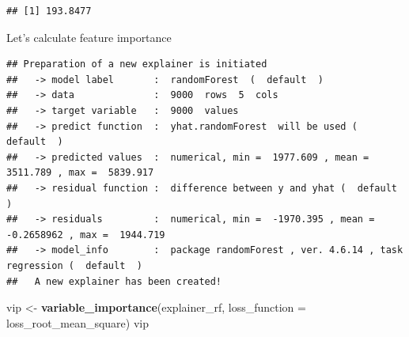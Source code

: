 \documentclass[12pt,]{krantz}
\newenvironment{Shaded}{\begin{snugshade}}{\end{snugshade}}
\newcommand{\DataTypeTok}[1]{\textcolor[rgb]{0.13,0.29,0.53}{#1}}
\newcommand{\DecValTok}[1]{\textcolor[rgb]{0.00,0.00,0.81}{#1}}
\newcommand{\KeywordTok}[1]{\textcolor[rgb]{0.13,0.29,0.53}{\textbf{#1}}}
\newcommand{\NormalTok}[1]{#1}
\newcommand{\OperatorTok}[1]{\textcolor[rgb]{0.81,0.36,0.00}{\textbf{#1}}}
\newcommand{\OtherTok}[1]{\textcolor[rgb]{0.56,0.35,0.01}{#1}}
\newcommand{\StringTok}[1]{\textcolor[rgb]{0.31,0.60,0.02}{#1}}
\begin{document}
\begin{Shaded}
\end{Shaded}

\begin{verbatim}
## [1] 193.8477
\end{verbatim}

Let's calculate feature importance

\begin{Shaded}
\end{Shaded}

\begin{verbatim}
## Preparation of a new explainer is initiated
##   -> model label       :  randomForest  (  default  )
##   -> data              :  9000  rows  5  cols 
##   -> target variable   :  9000  values 
##   -> predict function  :  yhat.randomForest  will be used (  default  )
##   -> predicted values  :  numerical, min =  1977.609 , mean =  3511.789 , max =  5839.917  
##   -> residual function :  difference between y and yhat (  default  )
##   -> residuals         :  numerical, min =  -1970.395 , mean =  -0.2658962 , max =  1944.719  
##   -> model_info        :  package randomForest , ver. 4.6.14 , task regression (  default  ) 
##   A new explainer has been created!
\end{verbatim}

\begin{Shaded}
\begin{Highlighting}[]
\NormalTok{vip <-}\StringTok{ }\KeywordTok{variable_importance}\NormalTok{(explainer_rf, }
            \DataTypeTok{loss_function =}\NormalTok{ loss_root_mean_square)}
\NormalTok{vip}
\end{Highlighting}
\end{Shaded}
\end{document}
